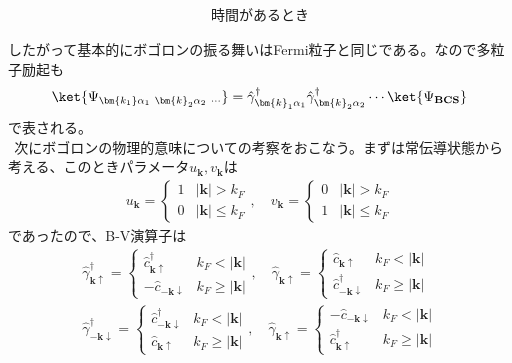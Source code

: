\documentclass[dvipdfmx, 11pt, a4paper]{jsarticle}
\numberwithin{equation}{section}
\theoremstyle{definition}
\begin{document}
    \begin{derivationBox}
        \begin{align}
            \textbf{時間があるとき}
        \end{align}
    \end{derivationBox}
    したがって基本的にボゴロンの振る舞いはFermi粒子と同じである。なので多粒子励起も
    \begin{align}
        \ket{\Psi_{\bm{k_1}\alpha_1\ \bm{k}_2\alpha_2\ \cdots}} = \hat{\gamma}_{\bm{k}_1 \alpha_1}^\dagger \hat{\gamma}_{\bm{k}_2 \alpha_2}^\dagger \cdots \ket{\Psi_{\textbf{BCS}}}
    \end{align}
    で表される。\\
    $\ \ $次にボゴロンの物理的意味についての考察をおこなう。まずは常伝導状態から考える、このときパラメータ$u_{\bm{k}},v_{\bm{k}}$は
    \begin{align}
        u_{\bm{k}} = 
        \left\{
        \begin{matrix}
            1& |\bm{k}| > k_F\\
            0& |\bm{k}| \le k_F
        \end{matrix}
        \right. ,\quad
        v_{\bm{k}} = 
        \left\{
        \begin{matrix}
            0& |\bm{k}| > k_F\\
            1& |\bm{k}| \le k_F
        \end{matrix}
        \right.
    \end{align}
    であったので、B-V演算子は
    \begin{align}
        \hat{\gamma}^\dagger_{\bm{k}\uparrow} = 
        \left\{
        \begin{matrix}
            \hat{c}_{\bm{k}\uparrow}^\dagger&k_F < |\bm{k}|\\
            -\hat{c}_{-\bm{k}\downarrow}&k_F\ge |\bm{k}|
        \end{matrix}
        \right. ,\quad 
        \hat{\gamma}_{\bm{k}\uparrow} = 
        \left\{
        \begin{matrix}
            \hat{c}_{\bm{k}\uparrow}&k_F < |\bm{k}|\\
            \hat{c}_{-\bm{k}\downarrow}^\dagger&k_F\ge |\bm{k}|
        \end{matrix}
        \right.\\
        \hat{\gamma}^\dagger_{-\bm{k}\downarrow} = 
        \left\{
        \begin{matrix}
            \hat{c}_{-\bm{k}\downarrow}^\dagger&k_F < |\bm{k}|\\
            \hat{c}_{\bm{k}\uparrow}&k_F\ge |\bm{k}|
        \end{matrix}
        \right. ,\quad 
        \hat{\gamma}_{\bm{k}\uparrow} = 
        \left\{
        \begin{matrix}
            -\hat{c}_{-\bm{k}\downarrow}&k_F < |\bm{k}|\\
            \hat{c}_{\bm{k}\uparrow}^\dagger&k_F\ge |\bm{k}|
        \end{matrix}
        \right.
    \end{align}
\end{document}
